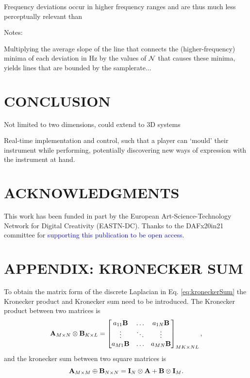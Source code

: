\documentclass[fleqn]{jaes}
\def\SWcomment[#1]{\textcolor{blue}{#1}}
\begin{document}
Frequency deviations occur in higher frequency ranges and are thus much less perceptually relevant than 

Notes:

Multiplying the average slope of the line that connects the (higher-frequency) minima of each deviation in Hz by the values of $\mathcal{N}$ that causes these minima, yields lines that are bounded by the samplerate...



\section{CONCLUSION}\label{sec:conclusion}
Not limited to two dimensions, could extend to 3D systems

Real-time implementation and control, such that a player can `mould' their instrument while performing, potentially discovering new ways of expression with the instrument at hand.   

\section{ACKNOWLEDGMENTS}
This  work  has  been  funded  in  part  by  the European Art-Science-Technology Network for Digital Creativity (EASTN-DC). Thanks to the DAFx20in21 committee for \SWcomment[supporting this publication to be open access].




\appendix
\section*{APPENDIX: KRONECKER SUM}\label{app:kronecker}
To obtain the matrix form of the discrete Laplacian in Eq. \eqref{eq:kroneckerSum} the Kronecker product and Kronecker sum need to be introduced. The Kronecker product between two matrices is \cite{Horn1991}
\begin{equation}
    \mathbf{A}_{M\times N} \otimes \mathbf{B}_{K\times L} = \begin{bmatrix}
        a_{11}\mathbf{B} & \hdots & a_{1N}\mathbf{B}\\
        \vdots & \ddots & \vdots\\
        a_{M1}\mathbf{B} & \hdots & a_{MN}\mathbf{B}\\
    \end{bmatrix}_{MK \times NL},
\end{equation}
and the kronecker sum between two square matrices is \cite{Hamilton2016}
\begin{equation}\label{eq:kronSum}
    \A_{M \times M} \oplus \B_{N \times N} = \I_N\otimes \A + \B \otimes\I_M.
\end{equation}
\end{document}
